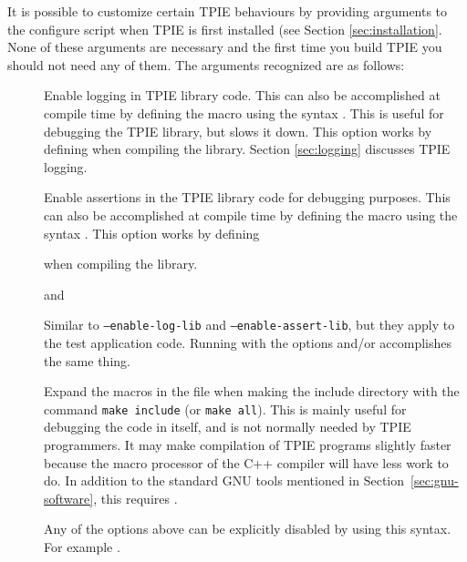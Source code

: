 It is possible to customize certain TPIE behaviours by
providing arguments to the {configure} script when TPIE is
first installed (see Section
\ref{sec:installation}. None of
these arguments are necessary and the first time you build
TPIE you should not need any of them. The arguments
recognized are as follows:
\begin{description}

    \item[]
     Enable
    logging in TPIE library code.  This can also be
    accomplished at compile time by defining the macro
     using the syntax .  This is useful for debugging the
    TPIE library, but slows it down.  This option works by
    defining   when compiling the library.
    Section \ref{sec:logging} discusses TPIE logging.

    \item[]
    Enable assertions in the TPIE library code for debugging
    purposes.  This can also be accomplished at compile time
    by defining the macro  using the
    syntax .  This option
    works by defining 

     when
    compiling the library.
    \item[] and
    
    \item[]
     Similar
    to {\tt --enable-log-lib} and {\tt --enable-assert-lib},
    but they apply to the test application code.  Running
     with the options
     and/or
     accomplishes the same thing.
    
    \item[] Expand the
    macros in the file  when making the
    include directory with the command {\tt make include}
    (or {\tt make all}).  This is mainly useful for
    debugging the code in  itself, and
    is not normally needed by TPIE programmers.  It may make
    compilation of TPIE programs slightly faster because the
    macro processor of the C++ compiler will have less work
    to do.  In addition to the standard GNU tools mentioned
    in Section~\ref{sec:gnu-software}, this requires
    .
    
    \item[] Any of the options above can
    be explicitly disabled by using this syntax.  For
    example .
\end{description}

